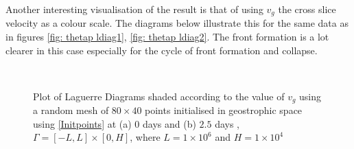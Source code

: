 Another interesting visualisation of the result is that of using $v_g$ the cross slice velocity as a colour scale. The diagrams below illustrate this for the same data as in figures \ref{fig: thetap ldiag1}, \ref{fig: thetap ldiag2}. The front formation is a lot clearer in this case especially for the cycle of front formation and collapse.
\newpage
\begin{figure}[ht!]
	\centering
	\\
	\caption{Plot of Laguerre Diagrams shaded according to the value of $v_g$ using a random mesh of $80 \times 40$ points initialised in geostrophic space using \ref{Initpoints} at (a) $0$ days and (b) $2.5$ days , $\Gamma = [-L,L]\times[0,H]$, where $L = 1\times10^6$ and $H = 1\times10^4$}
	\label{vg0}
\end{figure}
\newpage

